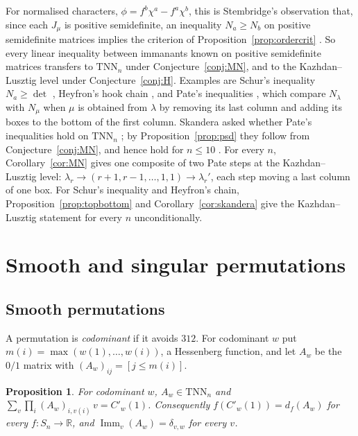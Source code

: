 \documentclass[11pt]{amsart}
\newtheorem{proposition}[theorem]{Proposition}
\theoremstyle{definition}
\theoremstyle{remark}
\newcommand{\R}{\mathbb{R}}
\newcommand{\Imm}{\operatorname{Imm}}
\newcommand{\TNN}{\mathrm{TNN}}
\newcommand{\Cp}[1]{C'_{#1}(1)}
\begin{document}
For normalised characters, $\phi=f^b\chi^a-f^a\chi^b$, this is Stembridge's observation that, since each $J_\mu$ is positive semidefinite, an inequality $N_a\ge N_b$ on positive semidefinite matrices implies the criterion of Proposition~\ref{prop:ordercrit} \cite[\S3]{Ste92}. So every linear inequality between immanants known on positive semidefinite matrices transfers to $\TNN_n$ under Conjecture~\ref{conj:MN}, and to the Kazhdan--Lusztig level under Conjecture~\ref{conj:H}. Examples are Schur's inequality $N_a\ge\det$ \cite{Sch18}, Heyfron's hook chain \cite{Hey88}, and Pate's inequalities \cite{Pat91}, which compare $N_\lambda$ with $N_\mu$ when $\mu$ is obtained from $\lambda$ by removing its last column and adding its boxes to the bottom of the first column. Skandera asked whether Pate's inequalities hold on $\TNN_n$ \cite[Problem~29]{Ska25}; by Proposition~\ref{prop:psd} they follow from Conjecture~\ref{conj:MN}, and hence hold for $n\le10$ \cite{McN}. For every $n$, Corollary~\ref{cor:MN} gives one composite of two Pate steps at the Kazhdan--Lusztig level: $\lambda_r\to(r+1,r-1,\dots,1,1)\to\lambda_r'$, each step moving a last column of one box. For Schur's inequality and Heyfron's chain, Proposition~\ref{prop:topbottom} and Corollary~\ref{cor:skandera} give the Kazhdan--Lusztig statement for every $n$ unconditionally.

\section{Smooth and singular permutations}\label{sec:smoothsing}

\subsection{Smooth permutations}\label{sec:smooth}
A permutation is \emph{codominant} if it avoids $312$. For codominant $w$ put $m(i)=\max(w(1),\dots,w(i))$, a Hessenberg function, and let $A_w$ be the $0/1$ matrix with $(A_w)_{ij}=[j\le m(i)]$.

\begin{proposition}\label{prop:hessenberg}
For codominant $w$, $A_w\in\TNN_n$ and $\sum_{v}\prod_i(A_w)_{i,v(i)}\,v=\Cp w$. Consequently $f(\Cp w)=d_f(A_w)$ for every $f\colon S_n\to\R$, and $\Imm_v(A_w)=\delta_{v,w}$ for every $v$.
\end{proposition}
\end{document}
